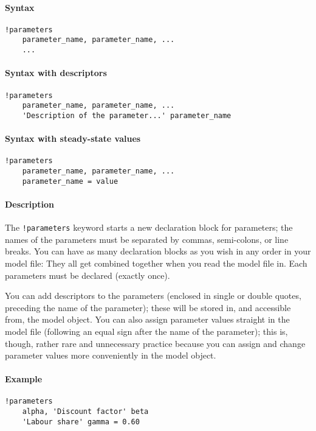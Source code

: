 


	\paragraph{Syntax}\label{syntax}

\begin{verbatim}
!parameters
    parameter_name, parameter_name, ...
    ...
\end{verbatim}

\paragraph{Syntax with descriptors}\label{syntax-with-descriptors}

\begin{verbatim}
!parameters
    parameter_name, parameter_name, ...
    'Description of the parameter...' parameter_name
\end{verbatim}

\paragraph{Syntax with steady-state
values}\label{syntax-with-steady-state-values}

\begin{verbatim}
!parameters
    parameter_name, parameter_name, ...
    parameter_name = value
\end{verbatim}

\paragraph{Description}\label{description}

The \texttt{!parameters} keyword starts a new declaration block for
parameters; the names of the parameters must be separated by commas,
semi-colons, or line breaks. You can have as many declaration blocks as
you wish in any order in your model file: They all get combined together
when you read the model file in. Each parameters must be declared
(exactly once).

You can add descriptors to the parameters (enclosed in single or double
quotes, preceding the name of the parameter); these will be stored in,
and accessible from, the model object. You can also assign parameter
values straight in the model file (following an equal sign after the
name of the parameter); this is, though, rather rare and unnecessary
practice because you can assign and change parameter values more
conveniently in the model object.

\paragraph{Example}\label{example}

\begin{verbatim}
!parameters
    alpha, 'Discount factor' beta
    'Labour share' gamma = 0.60
\end{verbatim}



